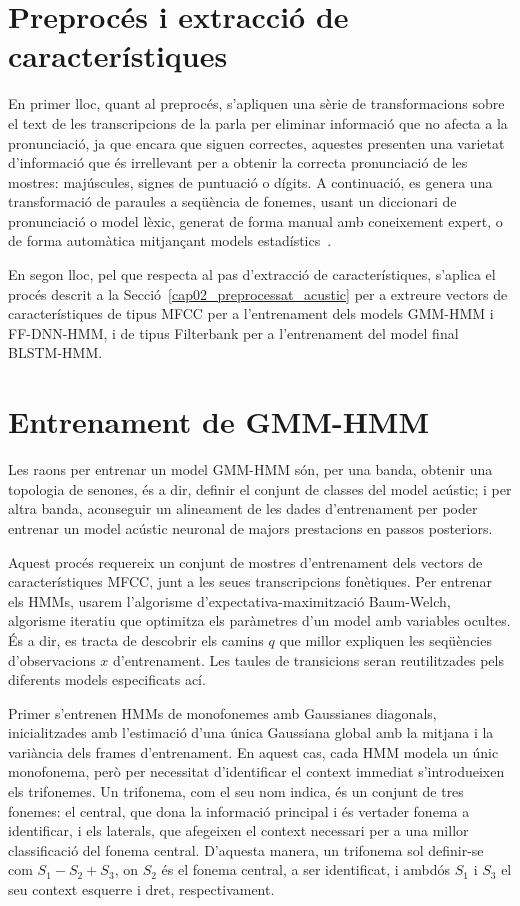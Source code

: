 \section{Preprocés i extracció de característiques}
\label{cap03_prepro}

En primer lloc, quant al preprocés, s'apliquen una sèrie de transformacions sobre el text de les transcripcions de la parla per eliminar informació que no afecta a la pronunciació, ja que encara que siguen correctes, aquestes presenten una varietat d'informació que és irrellevant per a obtenir la correcta pronunciació de les mostres: majúscules, signes de puntuació o dígits.
A continuació, es genera una transformació de paraules a seqüència de fonemes, usant un diccionari de pronunciació o model lèxic, generat de forma manual amb coneixement expert, o de forma automàtica mitjançant models estadístics~\cite{BISANI2008434}.

En segon lloc, pel que respecta al pas d'extracció de característiques, s'aplica el procés descrit a la Secció~\ref{cap02_preprocessat_acustic} per a extreure vectors de característiques de tipus MFCC per a l'entrenament dels models GMM-HMM i FF-DNN-HMM, i de tipus Filterbank per a l'entrenament del model final BLSTM-HMM. 


\section{Entrenament de GMM-HMM}
\label{cap03_gmmhmm}

Les raons per entrenar un model GMM-HMM són, per una banda, obtenir una topologia de senones, és a dir, definir el conjunt de classes del model acústic; i per altra banda, aconseguir un alineament de les dades d'entrenament per poder entrenar un model acústic neuronal de majors prestacions en passos posteriors.
    
Aquest procés requereix un conjunt de mostres d'entrenament dels vectors de característiques MFCC, junt a les seues transcripcions fonètiques.
Per entrenar els HMMs, usarem l'algorisme d'expectativa-maximització Baum-Welch, algorisme iteratiu que optimitza els paràmetres d'un model amb variables ocultes. És a dir, es tracta de descobrir els camins $q$ que millor expliquen les seqüències d'observacions $x$ d'entrenament.
Les taules de transicions seran reutilitzades pels diferents models especificats ací.

Primer s'entrenen HMMs de monofonemes amb Gaussianes diagonals, inicialitzades amb l'estimació d'una única Gaussiana global amb la mitjana i la variància dels frames d'entrenament.
En aquest cas, cada HMM modela un únic monofonema, però per necessitat d'identificar el context immediat s'introdueixen els trifonemes. Un trifonema, com el seu nom indica, és un conjunt de tres fonemes: el central, que dona la informació principal i és vertader fonema a identificar, i els laterals, que afegeixen el context necessari per a una millor classificació del fonema central. D'aquesta manera, un trifonema sol definir-se com $S_1-S_2+S_3$, on $S_2$ és el fonema central, a ser identificat, i ambdós $S_1$ i $S_3$ el seu context esquerre i dret, respectivament.

